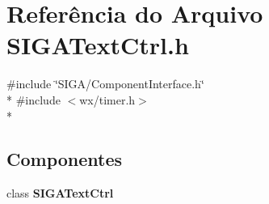 \section{Referência do Arquivo S\+I\+G\+A\+Text\+Ctrl.\+h}
\label{_s_i_g_a_text_ctrl_8h}
{\ttfamily \#include \char`\"{}S\+I\+G\+A/\+Component\+Interface.\+h\char`\"{}}\\*
{\ttfamily \#include $<$wx/timer.\+h$>$}\\*
\subsection*{Componentes}
\begin{DoxyCompactItemize}
\item 
class {\bf S\+I\+G\+A\+Text\+Ctrl}
\end{DoxyCompactItemize}
